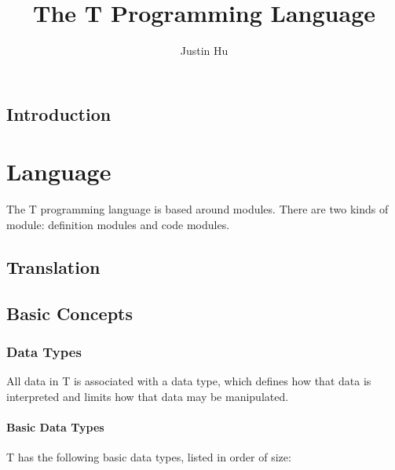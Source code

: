 \documentclass[letterpaper,12pt]{book}
\begin{document}
\title{The T Programming Language}
\author{Justin Hu}
\maketitle
\tableofcontents

\chapter{Introduction}

\part{Language}

The T programming language is based around modules. There are two kinds of module: definition modules and code modules.

\chapter{Translation}

\chapter{Basic Concepts}

\section{Data Types}

All data in T is associated with a data type, which defines how that data is interpreted and limits how that data may be manipulated.

\subsection{Basic Data Types}

T has the following basic data types, listed in order of size:
\end{document}
